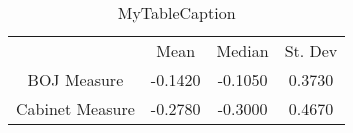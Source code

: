 \documentclass[10pt]{article}
\begin{document}
\begin{table}
\centering
\begin{tabular}{cccc}
 & Mean & Median & St. Dev \\
BOJ Measure & -0.1420 & -0.1050 & 0.3730 \\
Cabinet Measure & -0.2780 & -0.3000 & 0.4670 \\
\end{tabular}
\caption{MyTableCaption}
\label{table:MyTableLabel}
\end{table}
\end{document}
